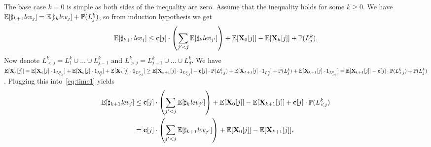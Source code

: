 The base case $k=0$ is simple as both sides of the inequality are zero. Assume 
that the inequality holds for some $k\geq 0$. We have 
$\mathbb{E}[\sharp_{k+1}\mathit{lev}_{j}]=\mathbb{E}[\sharp_{k}\mathit{lev}_{j}]+\mathbb{P}{(L_j^{k})}$, so from 
induction hypothesis we get 
\begin{equation}
\label{eq:time1}
\mathbb{E}[\sharp_{k+1}\mathit{lev}_{j}]\leq 
\mathbf{c}[j]\cdot\left(\sum_{j'<j}\mathbb{E}[\sharp_{k}\mathit{lev}_{j'}] \right)+ 
\mathbb{E}[\mathbf{X}_{0}[j]] - \mathbb{E}[\mathbf{X}_{k}[j]] + \mathbb{P}{(L_j^{k})}.\end{equation} 
Now denote 
$L^k_{<j} = L^k_1 \cup \dots\cup L^k_{j-1}$ and $L^k_{>j}= 
L^k_{j+1}\cup\dots\cup L^k_{d}$. We have  
$\mathbb{E}[\mathbf{X}_{k}[j]] = \mathbb{E}[\mathbf{X}_{k}[j]\cdot 
{1}_{ L_{<j}^k}] + \mathbb{E}[\mathbf{X}_{k}[j]\cdot 
{1}_{ L_j^k}] + \mathbb{E}[\mathbf{X}_{k}[j]\cdot 
	{1}_{L_{>j}^k}] \geq 
\mathbb{E}[\mathbf{X}_{k+1}[j]\cdot 
	{1}_{ L_{<j}^k}] -\mathbf{c}[j]\cdot \mathbb{P}(L_{<j}^k) + 
	\mathbb{E}[\mathbf{X}_{k+1}[j]\cdot 
	{1}_{ L_{j}^k}] + \mathbb{P}(L_{j}^k) + \mathbb{E}[\mathbf{X}_{k+1}[j]\cdot 
	{1}_{ L_{>j}^k}]= \mathbb{E}[\mathbf{X}_{k+1}[j]] -\mathbf{c}[j]\cdot 
	\mathbb{P}(L_{<j}^k)+ \mathbb{P}(L_{j}^k)$. Plugging this 
	into~\ref{eq:time1} yields
\begin{align*}
\mathbb{E}[\sharp_{k+1}\mathit{lev}_{j}]&\leq 
\mathbf{c}[j]\cdot\left(\sum_{j'<j}\mathbb{E}[\sharp_{k}\mathit{lev}_{j'}] \right)+ 
\mathbb{E}[\mathbf{X}_{0}[j]] - \mathbb{E}[\mathbf{X}_{k+1}[j]] + \mathbf{c}[j]\cdot 
\mathbb{P}(L_{<j}^k)\\
&=\mathbf{c}[j]\cdot\left(\sum_{j'<j}\mathbb{E}[\sharp_{k+1}\mathit{lev}_{j'}] \right)+ 
\mathbb{E}[\mathbf{X}_{0}[j]] - \mathbb{E}[\mathbf{X}_{k+1}[j]].
\end{align*}
 



